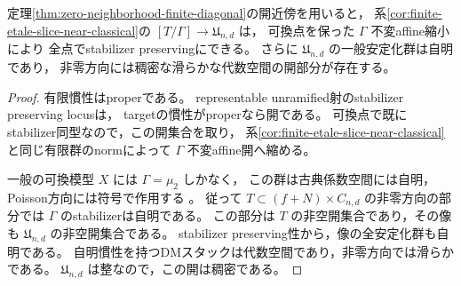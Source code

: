 \begin{corollary}[安定化群を保つsliceと一般安定化群]
\label{cor:stabilizer-preserving-slice-generic-trivial}
定理\ref{thm:zero-neighborhood-finite-diagonal}の開近傍を用いると，
系\ref{cor:finite-etale-slice-near-classical}の
$[T/\Gamma]\to\mathfrak U_{n,d}$ は，
可換点を保った $\Gamma$ 不変affine縮小により
全点でstabilizer preservingにできる。
さらに $\mathfrak U_{n,d}$ の一般安定化群は自明であり，
非零方向には稠密な滑らかな代数空間の開部分が存在する。
\end{corollary}
\begin{proof}
有限慣性はproperである。
representable unramified射のstabilizer preserving locusは，
targetの慣性がproperなら開である\cite[Tag 0DUA]{StacksProject}。
可換点で既にstabilizer同型なので，この開集合を取り，
系\ref{cor:finite-etale-slice-near-classical}と同じ有限群のnormによって
$\Gamma$ 不変affine開へ縮める。

一般の可換模型 $X$ には $\Gamma=\mu_2$ しかなく，
この群は古典係数空間には自明，Poisson方向には符号で作用する
\cite[命題9.4と注意8.5]{PoissonDP}。
従って $T\subset(f+N)\times C_{n,d}$ の非零方向の部分では
$\Gamma$ のstabilizerは自明である。
この部分は $T$ の非空開集合であり，その像も $\mathfrak U_{n,d}$ の非空開集合である。
stabilizer preserving性から，像の全安定化群も自明である。
自明慣性を持つDMスタックは代数空間であり，非零方向では滑らかである。
$\mathfrak U_{n,d}$ は整なので，この開は稠密である。
\end{proof}

